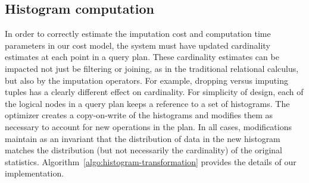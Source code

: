 %
%
%

\subsection{Histogram computation}
In order to correctly estimate the imputation cost and computation time parameters in our cost model,  the system must have updated cardinality estimates
at each point in a query plan. These cardinality estimates can be impacted not just be filtering or joining, as in the traditional relational calculus, but also by
the imputation operators. For example,  dropping versus imputing tuples has a clearly different effect on cardinality. For simplicity of design,
each of the logical nodes in a query plan keeps a reference to a set of histograms. The optimizer creates a copy-on-write of the histograms and modifies them
as necessary to account for new operations in the plan. In all cases, modifications maintain as an invariant that the distribution of data in the new histogram
matches the distribution (but not necessarily the cardinality) of the original statistics. Algorithm~\ref{algo:histogram-transformation} provides the details
of our implementation.



